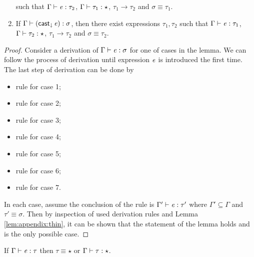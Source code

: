 \begin{lem}[Generation]
\begin{enumerate}[(1)]
such that $\Gamma  \vdash  \mathit{e}  :  \tau_{{\mathrm{2}}}$, $\Gamma  \vdash  \tau_{{\mathrm{1}}}  :  \star$, $\tau_{{\mathrm{1}}}  \longrightarrow  \tau_{{\mathrm{2}}}$ and $\sigma  \equiv  \tau_{{\mathrm{1}}}$.
	\item If $\Gamma  \vdash  (  \mathsf{cast}_{\downarrow} \, \mathit{e}  )  :  \sigma$, then there exist expressions
$\tau_{{\mathrm{1}}},\tau_{{\mathrm{2}}}$ such that $\Gamma  \vdash  \mathit{e}  :  \tau_{{\mathrm{1}}}$, $\Gamma  \vdash  \tau_{{\mathrm{2}}}  :  \star$, $\tau_{{\mathrm{1}}}  \longrightarrow  \tau_{{\mathrm{2}}}$ and
$\sigma  \equiv  \tau_{{\mathrm{2}}}$.
\end{enumerate}
\end{lem}

\begin{proof}
    Consider a derivation of $\Gamma  \vdash  \mathit{e}  :  \sigma$ for one of cases in the lemma. We
can follow the process of derivation until expression $\mathit{e}$ is introduced the
first time. The last step of derivation can be done by
    \begin{itemize}
        \item rule  for case 1;
        \item rule  for case 2;
        \item rule  for case 3;
        \item rule  for case 4;
        \item rule  for case 5;
        \item rule  for case 6;
        \item rule  for case 7.
    \end{itemize}
    In each case, assume the conclusion of the rule is $\Gamma'  \vdash  \mathit{e}  :  \tau'$ where
$\Gamma' \subseteq \Gamma$ and $\tau'  \equiv  \sigma$. Then by inspection of used
derivation rules and Lemma \ref{lem:appendix:thin}, it can be shown that the
statement of the lemma holds and is the only possible case.
\end{proof}

\begin{lem}\label{lem:appendix:corrtyp}
    If $\Gamma  \vdash  \mathit{e}  :  \tau$ then $\tau  \equiv  \star$ or $\Gamma  \vdash  \tau  :  \star$.
\end{lem}

